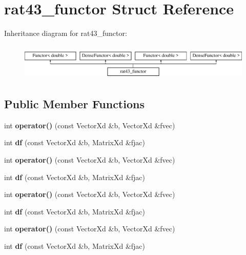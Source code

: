 \hypertarget{structrat43__functor}{}\section{rat43\+\_\+functor Struct Reference}
\label{structrat43__functor}
Inheritance diagram for rat43\+\_\+functor\+:\begin{figure}[H]
\begin{center}
\leavevmode
\includegraphics[height=1.728395cm]{structrat43__functor}
\end{center}
\end{figure}
\subsection*{Public Member Functions}
\begin{DoxyCompactItemize}
\item 
\mbox{\label{structrat43__functor_a95fc0d1fd9bc5a847828c3697531147b}} 
int {\bfseries operator()} (const Vector\+Xd \&b, Vector\+Xd \&fvec)
\item 
\mbox{\label{structrat43__functor_ae80e8d0d9679fb984d14368620c7cb1b}} 
int {\bfseries df} (const Vector\+Xd \&b, Matrix\+Xd \&fjac)
\item 
\mbox{\label{structrat43__functor_a95fc0d1fd9bc5a847828c3697531147b}} 
int {\bfseries operator()} (const Vector\+Xd \&b, Vector\+Xd \&fvec)
\item 
\mbox{\label{structrat43__functor_ae80e8d0d9679fb984d14368620c7cb1b}} 
int {\bfseries df} (const Vector\+Xd \&b, Matrix\+Xd \&fjac)
\item 
\mbox{\label{structrat43__functor_a95fc0d1fd9bc5a847828c3697531147b}} 
int {\bfseries operator()} (const Vector\+Xd \&b, Vector\+Xd \&fvec)
\item 
\mbox{\label{structrat43__functor_ae80e8d0d9679fb984d14368620c7cb1b}} 
int {\bfseries df} (const Vector\+Xd \&b, Matrix\+Xd \&fjac)
\item 
\mbox{\label{structrat43__functor_a95fc0d1fd9bc5a847828c3697531147b}} 
int {\bfseries operator()} (const Vector\+Xd \&b, Vector\+Xd \&fvec)
\item 
\mbox{\label{structrat43__functor_ae80e8d0d9679fb984d14368620c7cb1b}} 
int {\bfseries df} (const Vector\+Xd \&b, Matrix\+Xd \&fjac)
\end{DoxyCompactItemize}
